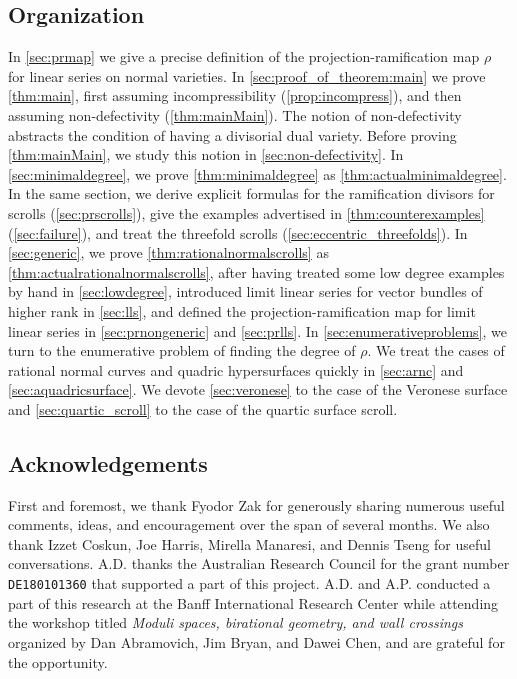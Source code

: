 \documentclass[11pt,reqno]{amsart}
\theoremstyle{plain}
\theoremstyle{definition}
\theoremstyle{remark}
\numberwithin{equation}{section}
\numberwithin{equation}{section}
\begin{document}
\subsection{Organization}
In \autoref{sec:prmap} we give a precise definition of the projection-ramification map $\rho$ for linear series on normal varieties.
In \autoref{sec:proof_of_theorem:main} we prove \autoref{thm:main}, first assuming incompressibility (\autoref{prop:incompress}), and then assuming non-defectivity (\autoref{thm:mainMain}).
The notion of non-defectivity abstracts the condition of having a divisorial dual variety.
Before proving \autoref{thm:mainMain}, we study this notion in \autoref{sec:non-defectivity}.
In \autoref{sec:minimaldegree}, we prove \autoref{thm:minimaldegree} as \autoref{thm:actualminimaldegree}.
In the same section, we derive explicit formulas for the ramification divisors for scrolls (\autoref{sec:prscrolls}), give the examples advertised in \autoref{thm:counterexamples} (\autoref{sec:failure}), and treat the threefold scrolls (\autoref{sec:eccentric_threefolds}).
In \autoref{sec:generic}, we prove \autoref{thm:rationalnormalscrolls} as \autoref{thm:actualrationalnormalscrolls}, after having treated some low degree examples by hand in \autoref{sec:lowdegree}, introduced limit linear series for vector bundles of higher rank in \autoref{sec:lls}, and defined the projection-ramification map for limit linear series in \autoref{sec:prnongeneric} and \autoref{sec:prlls}.
In \autoref{sec:enumerativeproblems}, we turn to the enumerative problem of finding the degree of $\rho$.
We treat the cases of rational normal curves and quadric hypersurfaces quickly in \autoref{sec:arnc} and \autoref{sec:aquadricsurface}.
We devote \autoref{sec:veronese} to the case of the Veronese surface and \autoref{sec:quartic_scroll} to the case of the quartic surface scroll.

\subsection*{Acknowledgements}
First and foremost, we thank Fyodor Zak for generously sharing numerous useful comments, ideas, and encouragement over the span of several months.
We also thank Izzet Coskun, Joe Harris, Mirella Manaresi, and Dennis Tseng for useful conversations. 
A.D. thanks the Australian Research Council for the grant number \texttt{DE180101360} that supported a part of this project.
A.D. and A.P. conducted a part of this research at the Banff International Research Center while attending the workshop titled \emph{Moduli spaces, birational geometry, and wall crossings} organized by Dan Abramovich, Jim Bryan, and Dawei Chen, and are grateful for the opportunity.
\end{document}
